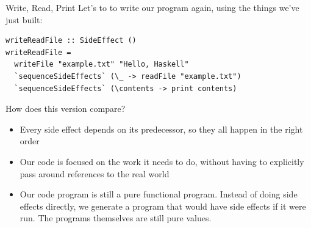 \documentclass[10pt, presentation, colorlinks]{beamer}
\begin{document}
\begin{frame}[label={sec:orge00cbae},fragile]{Write, Read, Print}
 Let's to to write our program again, using the things we've just built:

\begin{verbatim}
writeReadFile :: SideEffect ()
writeReadFile =
  writeFile "example.txt" "Hello, Haskell"
  `sequenceSideEffects` (\_ -> readFile "example.txt")
  `sequenceSideEffects` (\contents -> print contents)
\end{verbatim}

\bigskip

How does this version compare?

\bigskip

\pause
\begin{itemize}
\item Every side effect depends on its predecessor, so they all happen in the right order
\end{itemize}
\pause
\begin{itemize}
\item Our code is focused on the work it needs to do, without having to explicitly pass around references to the real world
\end{itemize}
\pause
\begin{itemize}
\item Our code program is still a \alert{pure functional program}. Instead of doing side effects directly, we \alert{generate a program} that would have side effects if it were run. The programs themselves are still pure values.
\end{itemize}
\end{frame}
\end{document}
